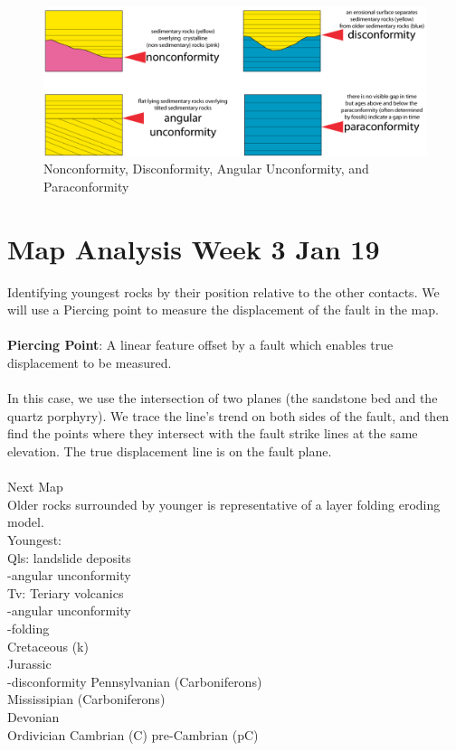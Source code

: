 \documentclass[12pt,a4paper]{report}
\begin{document}
\begin{figure}[h]
  \includegraphics[scale=0.30]{conformities.png}
  \centering
  \caption{Nonconformity, Disconformity, Angular Unconformity, and Paraconformity}
\end{figure}

\section*{Map Analysis Week 3 Jan 19}
Identifying youngest rocks by their position relative to the other contacts.
We will use a Piercing point to measure the displacement of the fault in the map.\\
\\
\textbf{Piercing Point}: A linear feature offset by a fault which enables true displacement to be measured.\\
\\
In this case, we use the intersection of two planes (the sandstone bed and the quartz porphyry).
We trace the line's trend on both sides of the fault, and then find the points where they intersect with the fault strike lines at the same elevation.
The true displacement line is on the fault plane.\\
\\
Next Map\\
Older rocks surrounded by younger is representative of a layer folding eroding model.\\
Youngest:\\
Qls: landslide deposits\\
-angular unconformity\\
Tv: Teriary volcanics\\
-angular unconformity\\
-folding\\
Cretaceous (k)\\
Jurassic\\
-disconformity
Pennsylvanian (Carboniferons)\\
Mississipian (Carboniferons)\\
Devonian\\
Ordivician
Cambrian (C)
pre-Cambrian (pC)
\end{document}
